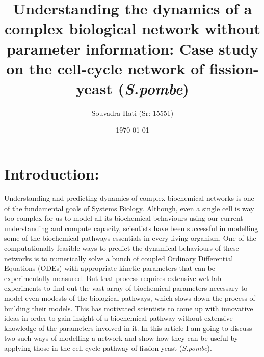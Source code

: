 \documentclass{article}
\title{Understanding the dynamics of a complex biological network without 
parameter information: Case study on the cell-cycle network 
of fission-yeast (\textit{S.pombe})}
\author{Souvadra Hati (Sr: 15551)}
\date\today
\begin{document}
\maketitle %

\section*{Introduction:} Understanding and predicting  dynamics of complex 
biochemical networks is one of the fundamental goals of Systems Biology. Although,
even a single cell is way too complex for us to model all its 
biochemical behaviours using our current understanding and compute capacity,
scientists have been successful in modelling some of the biochemical pathways
essentials in every living organism. One of the computationally feasible ways 
to predict the dynamical behaviours of these networks is to numerically solve a bunch of 
coupled Ordinary Differential Equations (ODEs) with appropriate kinetic parameters 
that can be experimentally measured. But that process requires extensive wet-lab
experiments to find out the vast array of biochemical parameters necessary to 
model even modests of the biological pathways, which slows down the process of 
building their models. This has motivated scientists to come up with innovative 
ideas in order to gain insight of a biochemical pathway without extensive 
knowledge of the parameters involved in it. In this article I am going to discuss
two such ways of modelling a network and show how they can be useful by applying 
those in the cell-cycle pathway of fission-yeast (\textit{S.pombe}).
\end{document}
